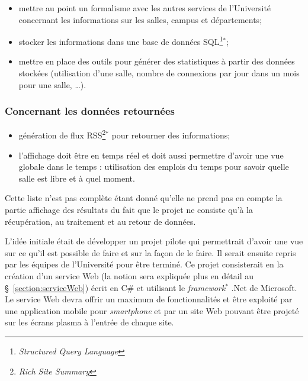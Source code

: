 \begin{itemize}
	\item mettre au point un formalisme avec les autres services de l'Universit\'e concernant les informations sur les salles, campus et d\'epartements;
	\item stocker les informations dans une base de donn\'ees SQL\protect\footnote{\textit{Structured Query Language}}$^*$;
	\item mettre en place des outils pour g\'en\'erer des statistiques \`a partir des donn\'ees stock\'ees (utilisation d'une salle, nombre de connexions par jour dans un mois pour une salle, \ldots).

\end{itemize}

\subsubsection{Concernant les donn\'ees retourn\'ees}

\begin{itemize}
	\item g\'en\'eration de flux RSS\protect\footnote{\textit{Rich Site Summary}}$^*$ pour retourner des informations;
	\item l'affichage doit \^etre en temps r\'eel et doit aussi permettre d'avoir une vue globale dans le temps : utilisation des emplois du temps pour savoir quelle salle est libre et \`a quel moment.

\end{itemize}

\vspace{0.20cm}

Cette liste n'est pas compl\`ete \'etant donn\'e qu'elle ne prend pas en compte la partie \og{}affichage\fg{} des r\'esultats du fait que le projet ne consiste qu'\`a la r\'ecup\'eration, au traitement et au retour de donn\'ees.

L'id\'ee initiale \'etait de d\'evelopper un projet pilote qui permettrait d'avoir une vue sur ce qu'il est possible de faire et sur la fa\c{c}on de le faire.
Il serait ensuite repris par les \'equipes de l'Universit\'e pour \^etre termin\'e.
Ce projet consisterait en la cr\'eation d'un service Web (la notion sera expliqu\'ee plus en d\'etail au \S~\ref{section:serviceWeb}) \'ecrit en C\# et utilisant le \textit{framework}$^*$ .Net de Microsoft.
Le service Web devra offrir un maximum de fonctionnalit\'es et \^etre exploit\'e par une application mobile pour \textit{smartphone} et par un site Web pouvant \^etre projet\'e sur les \'ecrans plasma \`a l'entr\'ee de chaque site.

